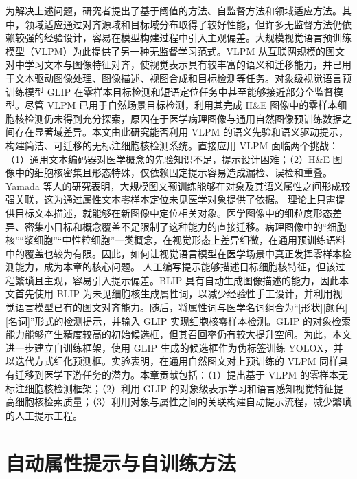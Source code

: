 为解决上述问题，研究者提出了基于阈值的方法\cite{jiao2006improved,mouelhi2018fast}、自监督方法\cite{sahasrabudhe2020self}和领域适应方法\cite{le2022unsupervised}。其中，领域适应通过对齐源域和目标域分布取得了较好性能\cite{le2022unsupervised}，但许多无监督方法仍依赖较强的经验设计，容易在模型构建过程中引入主观偏差。大规模视觉语言预训练模型（VLPM）为此提供了另一种无监督学习范式\cite{radford2021learning,jia2021scaling}。VLPM 从互联网规模的图文对中学习文本与图像特征对齐，使视觉表示具有较丰富的语义和迁移能力，并已用于文本驱动图像处理\cite{patashnik2021styleclip}、图像描述\cite{li2022blip}、视图合成\cite{jain2021putting}和目标检测\cite{li2022grounded}等任务。对象级视觉语言预训练模型 GLIP\cite{li2022grounded} 在零样本目标检测和短语定位任务中甚至能够接近部分全监督模型。尽管 VLPM 已用于自然场景目标检测，利用其完成 H\&E 图像中的零样本细胞核检测仍未得到充分探索，原因在于医学病理图像与通用自然图像预训练数据之间存在显著域差异。本文由此研究能否利用 VLPM 的语义先验和语义驱动提示，构建简洁、可迁移的无标注细胞核检测系统。直接应用 VLPM 面临两个挑战：（1）通用文本编码器对医学概念的先验知识不足，提示设计困难；（2）H\&E 图像中的细胞核密集且形态特殊，仅依赖固定提示容易造成漏检、误检和重叠。Yamada 等人的研究表明，大规模图文预训练能够在对象及其语义属性之间形成较强关联\cite{yamada2022lemons}，这为通过属性文本零样本定位未见医学对象提供了依据。
理论上只需提供目标文本描述，就能够在新图像中定位相关对象。医学图像中的细粒度形态差异、密集小目标和概念覆盖不足限制了这种能力的直接迁移。病理图像中的“细胞核”“浆细胞”“中性粒细胞”一类概念，在视觉形态上差异细微，在通用预训练语料中的覆盖也较为有限。因此，如何让视觉语言模型在医学场景中真正发挥零样本检测能力，成为本章的核心问题。
人工编写提示能够描述目标细胞核特征，但该过程繁琐且主观，容易引入提示偏差。BLIP\cite{li2022blip} 具有自动生成图像描述的能力，因此本文首先使用 BLIP 为未见细胞核生成属性词，以减少经验性手工设计，并利用视觉语言模型已有的图文对齐能力。随后，将属性词与医学名词组合为“[形状][颜色][名词]”形式的检测提示，并输入 GLIP 实现细胞核零样本检测。GLIP 的对象检索能力能够产生精度较高的初始候选框，但其召回率仍有较大提升空间。为此，本文进一步建立自训练框架，使用 GLIP 生成的候选框作为伪标签训练 YOLOX\cite{ge2021yolox}，并以迭代方式细化预测框。实验表明，在通用自然图文对上预训练的 VLPM 同样具有迁移到医学下游任务的潜力。本章贡献包括：（1）提出基于 VLPM 的零样本无标注细胞核检测框架；（2）利用 GLIP 的对象级表示学习和语言感知视觉特征提高细胞核检索质量；（3）利用对象与属性之间的关联构建自动提示流程，减少繁琐的人工提示工程。

\section{自动属性提示与自训练方法}

